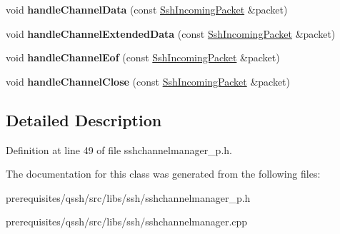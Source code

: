 \begin{DoxyCompactItemize}
void {\bfseries handle\+Channel\+Data} (const \mbox{\hyperlink{class_q_ssh_1_1_internal_1_1_ssh_incoming_packet}{Ssh\+Incoming\+Packet}} \&packet)
\item 
\mbox{\label{class_q_ssh_1_1_internal_1_1_ssh_channel_manager_a5f3009941cade1f06818e2458990e4b4}} 
void {\bfseries handle\+Channel\+Extended\+Data} (const \mbox{\hyperlink{class_q_ssh_1_1_internal_1_1_ssh_incoming_packet}{Ssh\+Incoming\+Packet}} \&packet)
\item 
\mbox{\label{class_q_ssh_1_1_internal_1_1_ssh_channel_manager_afa371f013e9969bf84aab5bf59b7b7f5}} 
void {\bfseries handle\+Channel\+Eof} (const \mbox{\hyperlink{class_q_ssh_1_1_internal_1_1_ssh_incoming_packet}{Ssh\+Incoming\+Packet}} \&packet)
\item 
\mbox{\label{class_q_ssh_1_1_internal_1_1_ssh_channel_manager_a9498923058c2bb234ff20c3469d1583f}} 
void {\bfseries handle\+Channel\+Close} (const \mbox{\hyperlink{class_q_ssh_1_1_internal_1_1_ssh_incoming_packet}{Ssh\+Incoming\+Packet}} \&packet)
\end{DoxyCompactItemize}


\subsection{Detailed Description}


Definition at line 49 of file sshchannelmanager\+\_\+p.\+h.



The documentation for this class was generated from the following files\+:\begin{DoxyCompactItemize}
\item 
prerequisites/qssh/src/libs/ssh/sshchannelmanager\+\_\+p.\+h\item 
prerequisites/qssh/src/libs/ssh/sshchannelmanager.\+cpp\end{DoxyCompactItemize}
